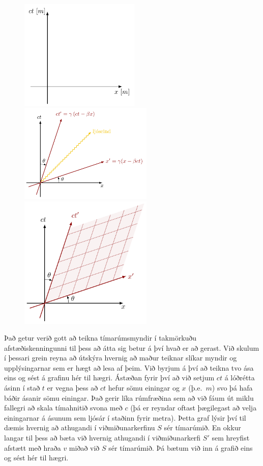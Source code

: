 \ifdefined \wholebook \else\documentclass[oneside]{book}\usepackage{EdlBook}\graphicspath{{figures/}}
\begin{document}
\begin{minipage}{\linewidth}

\begin{figure}
\vspace{-2cm}
\includegraphics[width = 2.25in]{figures/spacetime1.pdf}
\includegraphics[width = 2.5in]{figures/spacetime2.pdf}
\includegraphics[width = 2.5in]{figures/spacetime3.pdf}
\end{figure}
Það getur verið gott að teikna tímarúmsmyndir í takmörkuðu afstæðiskenningunni til þess að átta sig betur á því hvað er að gerast. Við skulum í þessari grein reyna að útskýra hvernig að maður teiknar slíkar myndir og upplýsingarnar sem er hægt að lesa af þeim. Við byrjum á því að teikna tvo ása eins og sést á grafinu hér til hægri. Ástæðan fyrir því að við setjum $ct$ á lóðrétta ásinn í stað $t$ er vegna þess að $ct$ hefur sömu einingar og $x$ (þ.e.~$\si{m}$) svo þá hafa báðir ásanir sömu einingar. Það gerir líka rúmfræðina sem að við fáum út miklu fallegri að skala tímahnitið svona með $c$ (þá er reyndar oftast þægilegast að velja einingarnar á ásunum sem ljósár í staðinn fyrir metra). Þetta graf lýsir því til dæmis hvernig að athugandi í viðmiðunarkerfinu $S$ sér tímarúmið. En okkur langar til þess að bæta við hvernig athugandi í viðmiðunarkerfi $S'$ sem hreyfist afstætt með hraða $v$ miðað við $S$ sér tímarúmið. Þá bætum við inn á grafið eins og sést hér til hægri.


\end{minipage}
\end{document}
